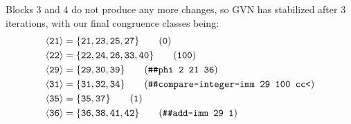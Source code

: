 Blocks $3$ and $4$ do not produce any more changes, so \gls{GVN} has stabilized
after $3$ iterations, with our final congruence classes being:
%
\begin{align*}
  \vn{21} &= \{\vreg{21},
               \vreg{23},
               \vreg{25},
               \vreg{27}\} \tag{\texttt{0}} \\
  \vn{22} &= \{\vreg{22},
               \vreg{24},
               \vreg{26},
               \vreg{33},
               \vreg{40}\} \tag{\texttt{100}} \\
  \vn{29} &= \{\vreg{29},
               \vreg{30},
               \vreg{39}\} \tag{\texttt{\#\#phi 2 21 36}} \\
  \vn{31} &= \{\vreg{31},
               \vreg{32},
               \vreg{34}\} \tag{\texttt{\#\#compare-integer-imm 29 100 cc<}} \\
  \vn{35} &= \{\vreg{35},
               \vreg{37}\} \tag{\texttt{1}} \\
  \vn{36} &= \{\vreg{36},
               \vreg{38},
               \vreg{41},
               \vreg{42}\} \tag{\texttt{\#\#add-imm 29 1}}
\end{align*}
